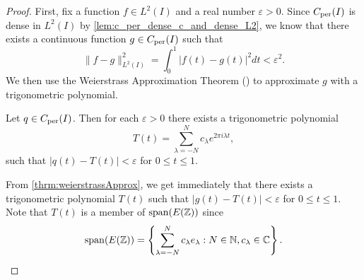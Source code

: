 \documentclass[../thesis.tex]{subfiles}
\begin{document}
\begin{proof}
    First, fix a function $f\in L^2(I)$ and a real number $\varepsilon >0$. Since $C_{\text{per}}(I)$ is dense in $L^2(I)$ by \cref{lem:c_per_dense_c_and_dense_L2}, we know that there exists a continuous function $g \in C_{\text{per}}(I)$ such that
    \begin{equation}\label{eq:estimate_1}
        \| f-g \|_{L^2(I)}^2 = \int_0^1 \left|f(t)-g(t) \right|^2dt < \varepsilon^2.
    \end{equation}
    We then use the Weierstrass Approximation Theorem (\cite[p.~202]{durenInvitationClassicalAnalysis2012}) to approximate $g$ with a trigonometric polynomial. 
    \begin{theorem}\label{thrm:weierstrassApprox}
        Let $q\in C_{\text{per}} (I)$. Then for each $\varepsilon>0$ there exists a trigonometric polynomial %
        \begin{equation*}
            T(t) = \sum_{\lambda=-N}^N c_\lambda e^{2\pi i \lambda t},
        \end{equation*}
        such that $|q(t)-T(t)|<\varepsilon$ for $0 \leq t \leq 1$.
    \end{theorem}
    From \cref{thrm:weierstrassApprox}, we get immediately that there exists a trigonometric polynomial $T(t)$ such that $|g(t)-T(t)|<\varepsilon$ for $0 \leq t \leq 1$. Note that $T(t)$ is a member of $\operatorname{span}(E(\mathbb{Z}))$ since %
    \begin{equation*}
        \spn{E(\Z)}=\braqMed{\sum_{\lambda=-N}^N c_\lambda e_\lambda : N \in \N, c_\lambda \in \C}.

\end{equation*}
\end{proof}
\end{document}
